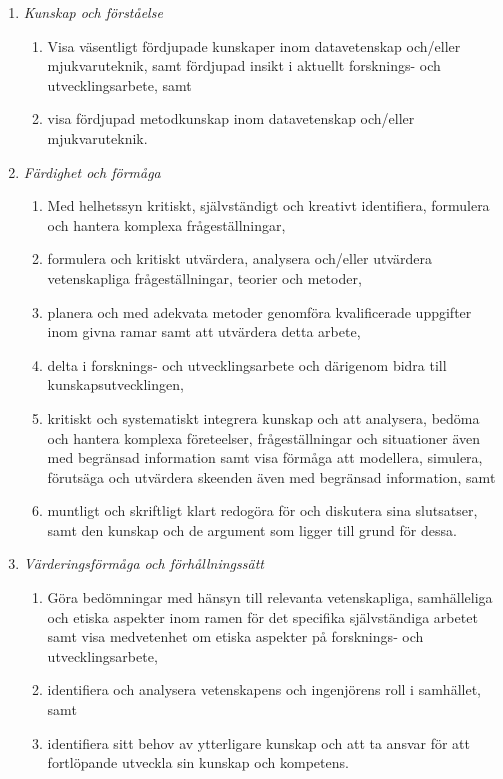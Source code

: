 \begin{enumerate}
\def\labelenumi{\Alph{enumi}.}
\tightlist
\item
  \emph{Kunskap och förståelse}

  \begin{enumerate}
  \def\labelenumii{\Alph{enumi}.\arabic{enumii}.}
  \tightlist
  \item
    Visa väsentligt fördjupade kunskaper inom datavetenskap och/eller
    mjukvaruteknik, samt fördjupad insikt i aktuellt forsknings- och
    utvecklingsarbete, samt
  \item
    visa fördjupad metodkunskap inom datavetenskap och/eller
    mjukvaruteknik.
  \end{enumerate}
\item
  \emph{Färdighet och förmåga}

  \begin{enumerate}
  \def\labelenumii{\Alph{enumi}.\arabic{enumii}.}
  \tightlist
  \item
    Med helhetssyn kritiskt, självständigt och kreativt identifiera,
    formulera och hantera komplexa frågeställningar,
  \item
    formulera och kritiskt utvärdera, analysera och/eller utvärdera
    vetenskapliga frågeställningar, teorier och metoder,
  \item
    planera och med adekvata metoder genomföra kvalificerade uppgifter
    inom givna ramar samt att utvärdera detta arbete,
  \item
    delta i forsknings‐ och utvecklingsarbete och därigenom bidra till
    kunskapsutvecklingen,
  \item
    kritiskt och systematiskt integrera kunskap och att analysera,
    bedöma och hantera komplexa företeelser, frågeställningar och
    situationer även med begränsad information samt visa förmåga att
    modellera, simulera, förutsäga och utvärdera skeenden även med
    begränsad information, samt
  \item
    muntligt och skriftligt klart redogöra för och diskutera sina
    slutsatser, samt den kunskap och de argument som ligger till grund
    för dessa.
  \end{enumerate}
\item
  \emph{Värderingsförmåga och förhållningssätt}

  \begin{enumerate}
  \def\labelenumii{\Alph{enumi}.\arabic{enumii}.}
  \tightlist
  \item
    Göra bedömningar med hänsyn till relevanta vetenskapliga,
    samhälleliga och etiska aspekter inom ramen för det specifika
    självständiga arbetet samt visa medvetenhet om etiska aspekter på
    forsknings‐ och utvecklingsarbete,
  \item
    identifiera och analysera vetenskapens och ingenjörens roll i
    samhället, samt
  \item
    identifiera sitt behov av ytterligare kunskap och att ta ansvar för
    att fortlöpande utveckla sin kunskap och kompetens.
  \end{enumerate}
\end{enumerate}

